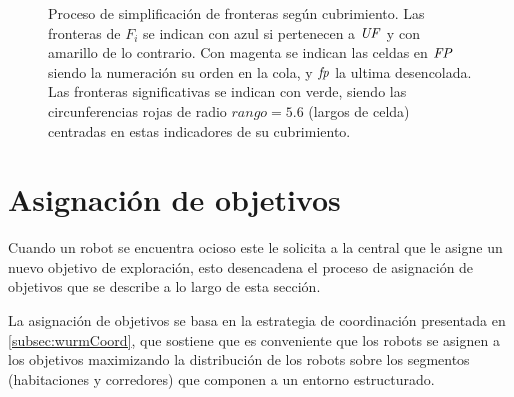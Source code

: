 \begin{figure}[H]
  \centerfloat
  \setcounter{subfigure}{6}

  \caption[Proceso de simplificación de fronteras según cubrimiento.]{Proceso
    de simplificación de fronteras según cubrimiento.  Las fronteras de
    $F_i$ se indican con azul si pertenecen a $\mathit{UF}$ y con amarillo de lo
    contrario. Con magenta se indican las celdas en $\mathit{FP}$ siendo la
  numeración su orden en la cola, y $\mathit{fp}$ la ultima desencolada. Las fronteras significativas se indican con
verde, siendo las circunferencias rojas de radio $rango=5.6$ (largos de celda) centradas en estas indicadores de su cubrimiento.}\label{fig:ejemploFSCub}
\end{figure}

\section{Asignación de objetivos}\label{sec:asigTar}

Cuando un robot se encuentra ocioso este le solicita a la central que le asigne
un nuevo objetivo de exploración, esto desencadena el proceso de asignación de
objetivos que se describe a lo largo de esta sección.

La asignación de objetivos se basa en la estrategia de coordinación presentada
en \ref{subsec:wurmCoord}, que sostiene que es conveniente que los robots se
asignen a los objetivos maximizando la distribución de los robots
sobre los segmentos (habitaciones y corredores) que componen a un entorno
estructurado.

